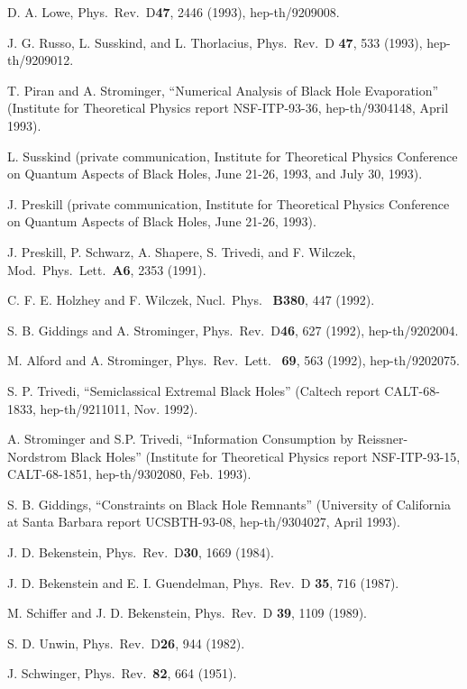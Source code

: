 \begin{thebibliography}{999}
 D. A. Lowe, Phys.\ Rev.\ D{\bf 47}, 2446 (1993),
hep-th/9209008.

 J. G. Russo, L. Susskind, and L. Thorlacius, Phys.\
Rev.\ D{\bf
47}, 533 (1993), hep-th/9209012.

 T. Piran and A. Strominger, ``Numerical Analysis of
Black Hole
Evaporation'' (Institute for Theoretical Physics report
NSF-ITP-93-36,
hep-th/9304148, April 1993).

 L. Susskind (private communication, Institute for
Theoretical
Physics Conference on Quantum Aspects of Black Holes, June 21-26,
1993,
and July 30, 1993).

 J. Preskill (private communication, Institute for
Theoretical
Physics Conference on Quantum Aspects of Black Holes, June 21-26,
1993).

 J. Preskill, P. Schwarz, A. Shapere, S. Trivedi, and
F.
Wilczek,
Mod.\ Phys.\ Lett.\ {\bf A6}, 2353 (1991).

 C. F. E. Holzhey and F. Wilczek, Nucl.\ Phys.\ {\bf
B380}, 447
(1992).

 S. B. Giddings and A. Strominger, Phys.\ Rev.\
D{\bf 46},
627
(1992), hep-th/9202004.

 M. Alford and A. Strominger, Phys.\ Rev.\ Lett.\ {\bf
69}, 563
(1992), hep-th/9202075.

 S. P. Trivedi, ``Semiclassical Extremal Black Holes''
(Caltech report CALT-68-1833, hep-th/9211011, Nov. 1992).

 A. Strominger and S.P. Trivedi, ``Information
Consumption by
Reissner-Nordstrom Black Holes'' (Institute for Theoretical Physics
report
NSF-ITP-93-15, CALT-68-1851, hep-th/9302080, Feb. 1993).

 S. B. Giddings, ``Constraints on Black Hole
Remnants''
(University of California at Santa Barbara report UCSBTH-93-08,
hep-th/9304027,
April 1993).

 J. D. Bekenstein, Phys.\ Rev.\ D{\bf 30}, 1669
(1984).

 J. D. Bekenstein and E. I. Guendelman, Phys.\ Rev.\
D{\bf
35},
716 (1987).

 M. Schiffer and J. D. Bekenstein, Phys.\ Rev.\ D{\bf
39},
1109
(1989).

 S. D. Unwin, Phys.\ Rev.\ D{\bf 26}, 944 (1982).

 J. Schwinger, Phys.\ Rev.\ {\bf 82}, 664 (1951).


\end{thebibliography}
